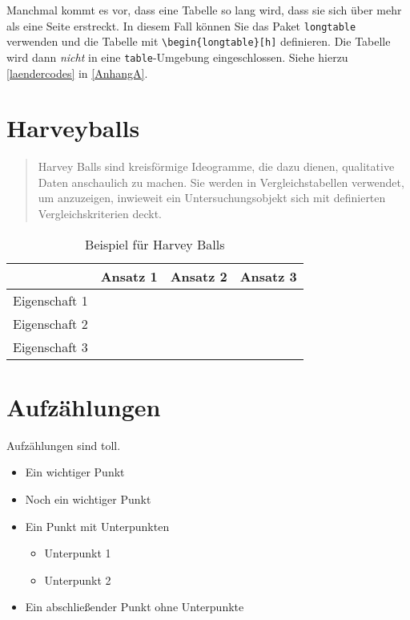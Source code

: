 Manchmal kommt es vor, dass eine Tabelle so lang wird, dass sie sich über mehr als eine Seite erstreckt. In diesem Fall können Sie das Paket \texttt{longtable} verwenden und die Tabelle mit \verb+\begin{longtable}[h]+ definieren. Die Tabelle wird dann \textit{nicht} in eine \texttt{table}-Umgebung eingeschlossen. Siehe hierzu \autoref{laendercodes} in \autoref{AnhangA}.


\section{Harveyballs}

\begin{quote}
    Harvey Balls sind kreisförmige Ideogramme, die dazu dienen, qualitative Daten anschaulich zu machen. Sie werden in Vergleichstabellen verwendet, um anzuzeigen, inwieweit ein Untersuchungsobjekt sich mit definierten Vergleichskriterien deckt. \parencite{Wikipedia_HarveyBalls}
\end{quote}

\begin{table}[h]
  \caption{Beispiel für Harvey Balls}
  \label{tab:harveyexample}
  \centering
  \begin{tabular}{lccc}
    \toprule
    & Ansatz 1 & Ansatz 2 & Ansatz 3\\
    \midrule
    Eigenschaft 1	& \harveyBallNone & \harveyBallQuarter & \harveyBallHalf \\
    Eigenschaft 2	& \harveyBallHalf & \harveyBallThreeQuarter & \harveyBallFull \\
    Eigenschaft 3	& \harveyBallFull & \harveyBallThreeQuarter & \harveyBallQuarter\\
    \bottomrule
  \end{tabular}
\end{table}


\section{Aufzählungen}

Aufzählungen sind toll.

\begin{itemize}
  \item Ein wichtiger Punkt
  \item Noch ein wichtiger Punkt
  \item Ein Punkt mit Unterpunkten
    \begin{itemize}
      \item Unterpunkt 1
      \item Unterpunkt 2
    \end{itemize}
  \item Ein abschließender Punkt ohne Unterpunkte
\end{itemize}


